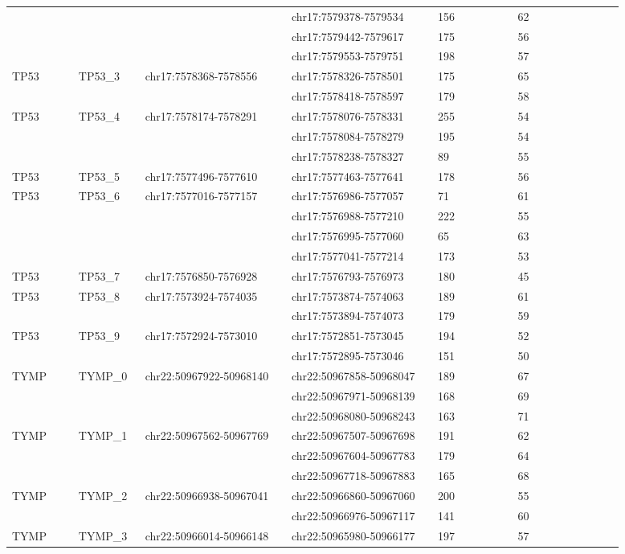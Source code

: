 \begin{landscape}
\begin{longtable}{p{0.1\linewidth}|p{0.1\linewidth}p{0.22\linewidth}p{0.22\linewidth}p{0.12\linewidth}p{0.16\linewidth}}
 & & & chr17:7579378-7579534 & 156 & 62
\\
 & & & chr17:7579442-7579617 & 175 & 56
\\
 & & & chr17:7579553-7579751 & 198 & 57
\\
TP53 & TP53\_3 & chr17:7578368-7578556 & chr17:7578326-7578501 & 175 & 65
\\
 & & & chr17:7578418-7578597 & 179 & 58
\\
TP53 & TP53\_4 & chr17:7578174-7578291 & chr17:7578076-7578331 & 255 & 54
\\
 & & & chr17:7578084-7578279 & 195 & 54
\\
 & & & chr17:7578238-7578327 & 89 & 55
\\
TP53 & TP53\_5 & chr17:7577496-7577610 & chr17:7577463-7577641 & 178 & 56
\\
TP53 & TP53\_6 & chr17:7577016-7577157 & chr17:7576986-7577057 & 71 & 61
\\
 & & & chr17:7576988-7577210 & 222 & 55
\\
 & & & chr17:7576995-7577060 & 65 & 63
\\
 & & & chr17:7577041-7577214 & 173 & 53
\\
TP53 & TP53\_7 & chr17:7576850-7576928 & chr17:7576793-7576973 & 180 & 45
\\
TP53 & TP53\_8 & chr17:7573924-7574035 & chr17:7573874-7574063 & 189 & 61
\\
 & & & chr17:7573894-7574073 & 179 & 59
\\
TP53 & TP53\_9 & chr17:7572924-7573010 & chr17:7572851-7573045 & 194 & 52
\\
 & & & chr17:7572895-7573046 & 151 & 50
\\
\hline
TYMP & TYMP\_0 & chr22:50967922-50968140 & chr22:50967858-50968047 & 189 & 67
\\
 & & & chr22:50967971-50968139 & 168 & 69
\\
 & & & chr22:50968080-50968243 & 163 & 71
\\
TYMP & TYMP\_1 & chr22:50967562-50967769 & chr22:50967507-50967698 & 191 & 62
\\
 & & & chr22:50967604-50967783 & 179 & 64
\\
 & & & chr22:50967718-50967883 & 165 & 68
\\
TYMP & TYMP\_2 & chr22:50966938-50967041 & chr22:50966860-50967060 & 200 & 55
\\
 & & & chr22:50966976-50967117 & 141 & 60
\\
TYMP & TYMP\_3 & chr22:50966014-50966148 & chr22:50965980-50966177 & 197 & 57

\end{longtable}
\end{landscape}

